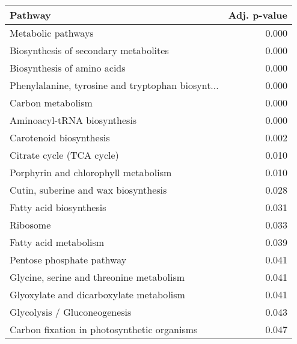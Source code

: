 \begin{tabular}{lr}
\toprule
                                           Pathway &  Adj. p-value \\
\midrule
                                Metabolic pathways &         0.000 \\
             Biosynthesis of secondary metabolites &         0.000 \\
                       Biosynthesis of amino acids &         0.000 \\
 Phenylalanine, tyrosine and tryptophan biosynt... &         0.000 \\
                                 Carbon metabolism &         0.000 \\
                       Aminoacyl-tRNA biosynthesis &         0.000 \\
                           Carotenoid biosynthesis &         0.002 \\
                         Citrate cycle (TCA cycle) &         0.010 \\
              Porphyrin and chlorophyll metabolism &         0.010 \\
              Cutin, suberine and wax biosynthesis &         0.028 \\
                           Fatty acid biosynthesis &         0.031 \\
                                          Ribosome &         0.033 \\
                             Fatty acid metabolism &         0.039 \\
                         Pentose phosphate pathway &         0.041 \\
          Glycine, serine and threonine metabolism &         0.041 \\
           Glyoxylate and dicarboxylate metabolism &         0.041 \\
                      Glycolysis / Gluconeogenesis &         0.043 \\
       Carbon fixation in photosynthetic organisms &         0.047 \\
\bottomrule
\end{tabular}
